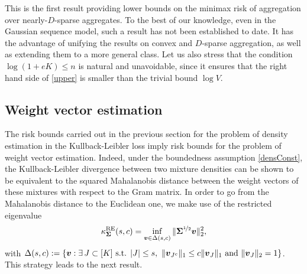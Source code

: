 This is the first result providing lower bounds on the minimax risk of aggregation over
nearly-$D$-sparse aggregates. To the best of our knowledge, even in the Gaussian sequence
model, such a result has not been established to date. It has the advantage of
unifying the results on convex and $D$-sparse aggregation, as well as extending them
to a more general class. Let us also stress that the condition $\log(1+eK)\le n$ 
is natural and unavoidable, since it ensures that the right hand side of \eqref{upper} 
is smaller than the trivial bound $\log V$.

\subsection{Weight vector estimation}
\label{ssec:weight}

The risk bounds carried out in the previous section for the problem of
density estimation in the Kullback-Leibler loss imply risk bounds for
the problem of weight vector estimation. Indeed, under the boundedness
assumption \eqref{densConst}, the Kullback-Leibler divergence between
two mixture densities can be shown to be equivalent to the squared
Mahalanobis distance between the weight vectors of these mixtures with
respect to the Gram matrix.  In order to go from the Mahalanobis distance
to the Euclidean one, we make use of the restricted eigenvalue
\begin{equation}
\kappa^{\rm RE}_{\boldsymbol\Sigma}(s,c)=\inf_{\boldsymbol v \in \Delta(s,c)}\| \boldsymbol\Sigma^{\nicefrac12}\boldsymbol v\|_2^{2},
\end{equation}
with $\Delta(s,c):=\{\bv: \exists\,J\subset [K] \text{ s.t. } |J|\le s,\
\|\bv_{J^{c}}\|_{1}\le c\|\bv_{J}\|_{1}\ \text{and}\ \|\bv_{J}\|_{2}=1\}$.
This strategy leads to the next result.


